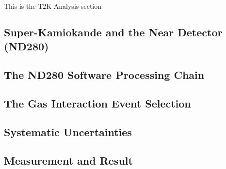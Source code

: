 This is the T2K Analysis section
\subsection{Super-Kamiokande and the Near Detector (ND280)}
\subsection{The ND280 Software Processing Chain}
\subsection{The Gas Interaction Event Selection}
\subsection{Systematic Uncertainties}
\subsection{Measurement and Result}